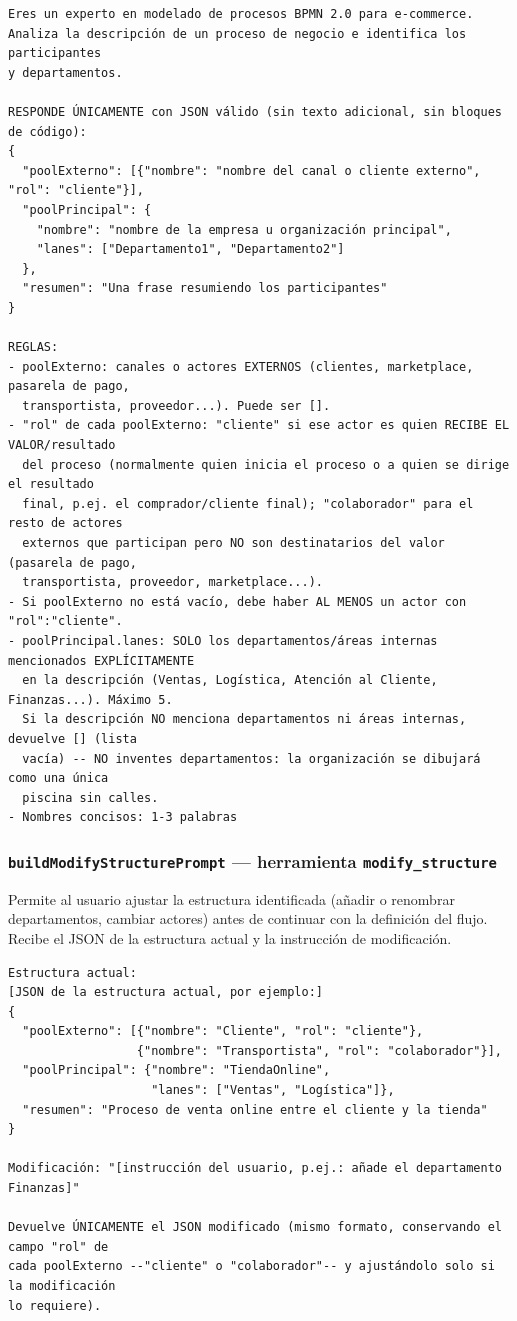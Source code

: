 \begin{lstlisting}[style=promptbox]
Eres un experto en modelado de procesos BPMN 2.0 para e-commerce.
Analiza la descripción de un proceso de negocio e identifica los participantes
y departamentos.

RESPONDE ÚNICAMENTE con JSON válido (sin texto adicional, sin bloques de código):
{
  "poolExterno": [{"nombre": "nombre del canal o cliente externo", "rol": "cliente"}],
  "poolPrincipal": {
    "nombre": "nombre de la empresa u organización principal",
    "lanes": ["Departamento1", "Departamento2"]
  },
  "resumen": "Una frase resumiendo los participantes"
}

REGLAS:
- poolExterno: canales o actores EXTERNOS (clientes, marketplace, pasarela de pago,
  transportista, proveedor...). Puede ser [].
- "rol" de cada poolExterno: "cliente" si ese actor es quien RECIBE EL VALOR/resultado
  del proceso (normalmente quien inicia el proceso o a quien se dirige el resultado
  final, p.ej. el comprador/cliente final); "colaborador" para el resto de actores
  externos que participan pero NO son destinatarios del valor (pasarela de pago,
  transportista, proveedor, marketplace...).
- Si poolExterno no está vacío, debe haber AL MENOS un actor con "rol":"cliente".
- poolPrincipal.lanes: SOLO los departamentos/áreas internas mencionados EXPLÍCITAMENTE
  en la descripción (Ventas, Logística, Atención al Cliente, Finanzas...). Máximo 5.
  Si la descripción NO menciona departamentos ni áreas internas, devuelve [] (lista
  vacía) -- NO inventes departamentos: la organización se dibujará como una única
  piscina sin calles.
- Nombres concisos: 1-3 palabras
\end{lstlisting}

\subsubsection{\texttt{buildModifyStructurePrompt} — herramienta \texttt{modify\_structure}}

Permite al usuario ajustar la estructura identificada (añadir o renombrar departamentos, cambiar actores) antes de continuar con la definición del flujo. Recibe el JSON de la estructura actual y la instrucción de modificación.

\begin{lstlisting}[style=promptbox]
Estructura actual:
[JSON de la estructura actual, por ejemplo:]
{
  "poolExterno": [{"nombre": "Cliente", "rol": "cliente"},
                  {"nombre": "Transportista", "rol": "colaborador"}],
  "poolPrincipal": {"nombre": "TiendaOnline",
                    "lanes": ["Ventas", "Logística"]},
  "resumen": "Proceso de venta online entre el cliente y la tienda"
}

Modificación: "[instrucción del usuario, p.ej.: añade el departamento Finanzas]"

Devuelve ÚNICAMENTE el JSON modificado (mismo formato, conservando el campo "rol" de
cada poolExterno --"cliente" o "colaborador"-- y ajustándolo solo si la modificación
lo requiere).
\end{lstlisting}

